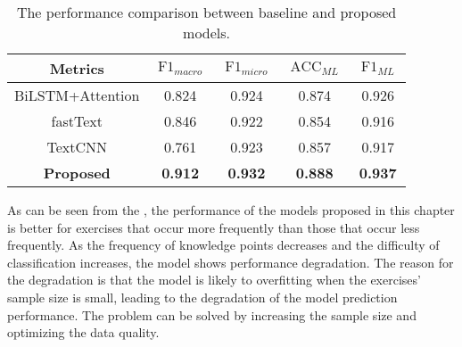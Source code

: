 \begin{table}[htbp!]
    \caption{The performance comparison between baseline and proposed models.}\label{tbl:ch2-result-bsline1}
    \centering
    \begin{tabular}{ccccc}
        \toprule
        Metrics           & \(\operatorname{F1}_{macro}\) & \(\operatorname{F1}_{micro}\) & \(\operatorname{ACC}_{ML}\) & \(\operatorname{F1}_{ML}\) \\
        \midrule
        BiLSTM+Attention  & 0.824                         & 0.924                         & 0.874                       & 0.926                      \\
        fastText          & 0.846                         & 0.922                         & 0.854                       & 0.916                      \\
        TextCNN           & 0.761                         & 0.923                         & 0.857                       & 0.917                      \\
        \textbf{Proposed} & \textbf{0.912}                & \textbf{0.932}                & \textbf{0.888}              & \textbf{0.937}             \\
        \bottomrule
    \end{tabular}
\end{table}

As can be seen from the \tblname{\ref{tbl:ch2-result-detail}}, the performance of the models proposed in this chapter is better for exercises that occur more frequently than those that occur less frequently. As the frequency of knowledge points decreases and the difficulty of classification increases, the model shows performance degradation. The reason for the degradation is that the model is likely to overfitting when the exercises' sample size is small, leading to the degradation of the model prediction performance. The problem can be solved by increasing the sample size and optimizing the data quality.

